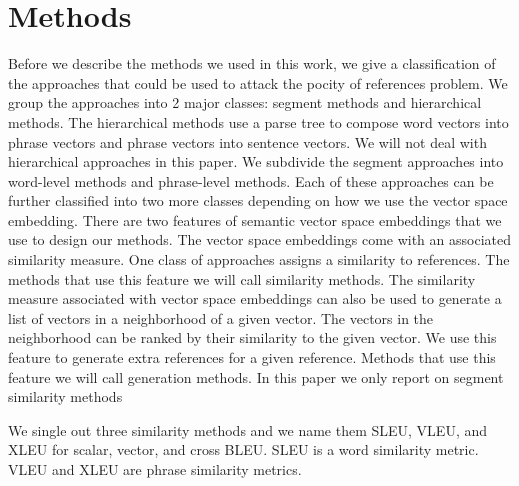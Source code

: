 
\section{Methods}
\label{sec:methods}




Before we describe the methods we used in this work, we give a classification of the approaches that could be used to attack the pocity of references problem. 
We group the approaches into 2 major classes: segment methods and hierarchical methods.
The hierarchical methods use a parse tree to compose word vectors into phrase vectors and phrase vectors into sentence vectors. 
We will not deal with hierarchical approaches in this paper. 
We subdivide the segment approaches into word-level methods and phrase-level methods. 
Each of these approaches can be further  classified into two more classes depending on how we use the vector space embedding. 
There are two features of semantic vector space embeddings that we use to design our methods. 
The vector space embeddings come with an associated similarity measure. 
One class of approaches assigns a similarity to references. 
The methods that use this feature we will call similarity methods. 
The similarity measure associated with vector space embeddings can also be used to generate a list of vectors in a neighborhood of a given vector. 
The vectors in the neighborhood can be ranked by their similarity to the given vector. 
We use this feature to generate extra references for a  given reference.
Methods that use this feature we will call generation methods. 
In this paper we only report on segment similarity methods 

We single out three similarity methods and we name them SLEU, VLEU, and XLEU for scalar, vector, and cross BLEU. 
SLEU is a word similarity metric. 
VLEU and XLEU are phrase similarity metrics. 

